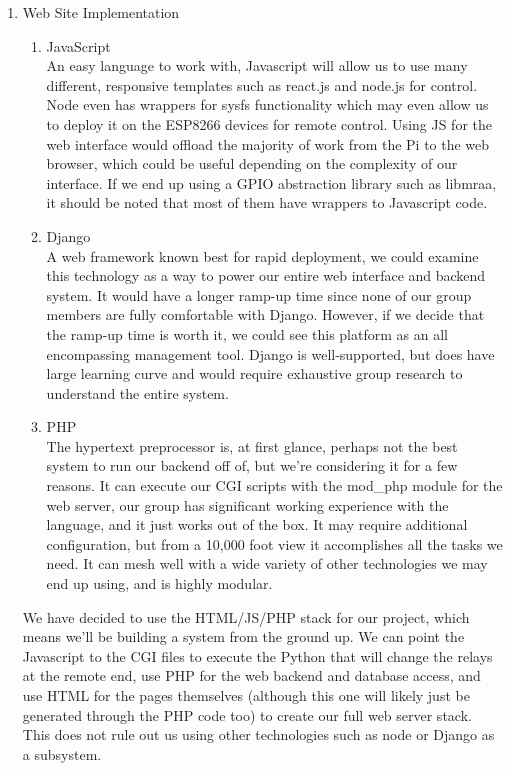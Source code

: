\begin{enumerate}
    \item Web Site Implementation
        \begin{enumerate}
            \item JavaScript \\
            An easy language to work with, Javascript will allow us to use many different, responsive templates such as react.js and node.js for control. Node even has wrappers for sysfs functionality which may even allow us to deploy it on the ESP8266 devices for remote control. Using JS for the web interface would offload the majority of work from the Pi to the web browser, which could be useful depending on the complexity of our interface. If we end up using a GPIO abstraction library such as libmraa, it should be noted that most of them have wrappers to Javascript code.
            \item Django \\
            A web framework known best for rapid deployment, we could examine this technology as a way to power our entire web interface and backend system. It would have a longer ramp-up time since none of our group members are fully comfortable with Django. However, if we decide that the ramp-up time is worth it, we could see this platform as an all encompassing management tool. Django is well-supported, but does have large learning curve and would require exhaustive group research to understand the entire system. 
            \item PHP \\
            The hypertext preprocessor is, at first glance, perhaps not the best system to run our backend off of, but we're considering it for a few reasons. It can execute our CGI scripts with the mod\_php module for the web server, our group has significant working experience with the language, and it just works out of the box. It may require additional configuration, but from a 10,000 foot view it accomplishes all the tasks we need. It can mesh well with a wide variety of other technologies we may end up using, and is highly modular.
        \end{enumerate}
        We have decided to use the HTML/JS/PHP stack for our project, which means we'll be building a system from the ground up. We can point the Javascript to the CGI files to execute the Python that will change the relays at the remote end, use PHP for the web backend and database access, and use HTML for the pages themselves (although this one will likely just be generated through the PHP code too) to create our full web server stack. This does not rule out us using other technologies such as node or Django as a subsystem.

\end{enumerate}
